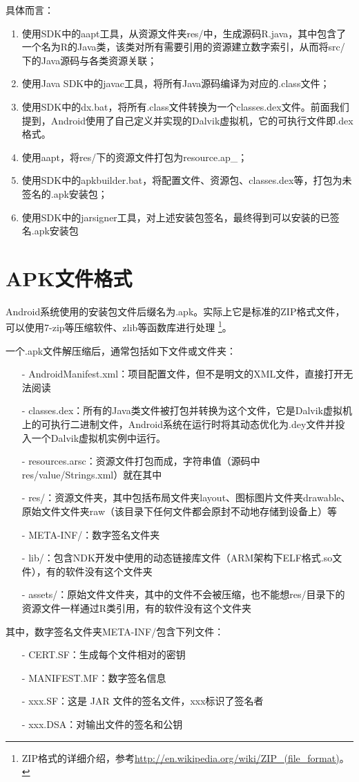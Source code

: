 具体而言：
\begin{enumerate}
	\item 使用SDK中的aapt工具，从资源文件夹res/中，生成源码R.java，其中包含了一个名为R的Java类，该类对所有需要引用的资源建立数字索引，从而将src/下的Java源码与各类资源关联；
	\item 使用Java SDK中的javac工具，将所有Java源码编译为对应的.class文件；
	\item 使用SDK中的dx.bat，将所有.class文件转换为一个classes.dex文件。前面我们提到，Android使用了自己定义并实现的Dalvik虚拟机，它的可执行文件即.dex格式。
	\item 使用aapt，将res/下的资源文件打包为resource.ap\_；
	\item 使用SDK中的apkbuilder.bat，将配置文件、资源包、classes.dex等，打包为未签名的.apk安装包；
	\item 使用SDK中的jarsigner工具，对上述安装包签名，最终得到可以安装的已签名.apk安装包
\end{enumerate}

\section{APK文件格式}
Android系统使用的安装包文件后缀名为.apk。实际上它是标准的ZIP格式文件，可以使用7-zip等压缩软件、zlib等函数库进行处理
\footnote{ZIP格式的详细介绍，参考\url{http://en.wikipedia.org/wiki/ZIP\_(file\_format)}。}。

一个.apk文件解压缩后，通常包括如下文件或文件夹：
\begin{itemize}
	\item[-] AndroidManifest.xml：项目配置文件，但不是明文的XML文件，直接打开无法阅读
	\item[-] classes.dex：所有的Java类文件被打包并转换为这个文件，它是Dalvik虚拟机上的可执行二进制文件，Android系统在运行时将其动态优化为.dey文件并投入一个Dalvik虚拟机实例中运行。
	\item[-] resources.arsc：资源文件打包而成，字符串值（源码中res/value/Strings.xml）就在其中
	\item[-] res/：资源文件夹，其中包括布局文件夹layout、图标图片文件夹drawable、原始文件文件夹raw（该目录下任何文件都会原封不动地存储到设备上）等
	\item[-] META-INF/：数字签名文件夹
	\item[-] lib/：包含NDK开发中使用的动态链接库文件（ARM架构下ELF格式.so文件），有的软件没有这个文件夹
	\item[-] assets/：原始文件文件夹，其中的文件不会被压缩，也不能想res/目录下的资源文件一样通过R类引用，有的软件没有这个文件夹
\end{itemize}

其中，数字签名文件夹META-INF/包含下列文件：
\begin{itemize}
	\item[-] CERT.SF：生成每个文件相对的密钥
	\item[-] MANIFEST.MF：数字签名信息
	\item[-] xxx.SF：这是 JAR 文件的签名文件，xxx标识了签名者
	\item[-] xxx.DSA：对输出文件的签名和公钥
\end{itemize}


